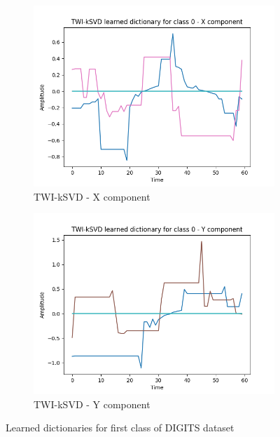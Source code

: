 \documentclass[11pt]{article}
\begin{document}
\begin{figure}[!ht]
      \begin{subfigure}[b]{0.49\textwidth}
        \includegraphics[width=\textwidth]{../../figures/TWI_kSVD_dictionnary_DIGITS_class_0_X.png}
        \caption*{TWI-kSVD - X component}
      \end{subfigure}
      \begin{subfigure}[b]{0.49\textwidth}
          \includegraphics[width=\textwidth]{../../figures/TWI_kSVD_dictionnary_DIGITS_class_0_Y.png}
          \caption*{TWI-kSVD - Y component}
        \end{subfigure}
    \caption{Learned dictionaries for first class of DIGITS dataset}\label{fig:learn_dicts_DIGITS}
\end{figure}
\end{document}
